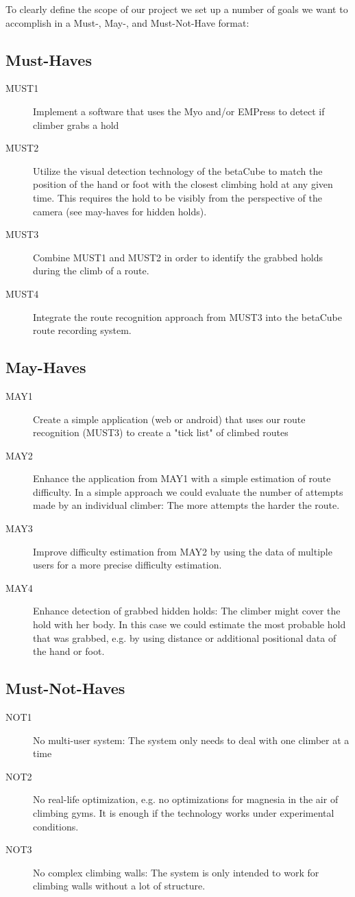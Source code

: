 To clearly define the scope of our project we set up a number of goals we want to accomplish in a Must-, May-, and Must-Not-Have format:

\subsection{Must-Haves}
\begin{description}
	\item[MUST1] Implement a software that uses the Myo and/or EMPress to detect if climber grabs a hold
	\item[MUST2] Utilize the visual detection technology of the betaCube to match the position of the hand or foot with the closest climbing hold at any given time. This requires the hold to be visibly from the perspective of the camera (see may-haves for hidden holds).
	\item[MUST3] Combine MUST1 and MUST2 in order to identify the grabbed holds during the climb of a route.
	\item[MUST4] Integrate the route recognition approach from MUST3 into the betaCube route recording system.
\end{description}
\subsection{May-Haves}
\begin{description}
	\item[MAY1] Create a simple application (web or android) that uses our route recognition (MUST3) to create a "tick list" of climbed routes
	\item[MAY2] Enhance the application from MAY1 with a simple estimation of route difficulty. In a simple approach we could evaluate the number of attempts made by an individual climber: The more attempts the harder the route.
	\item[MAY3] Improve difficulty estimation from MAY2 by using the data of multiple users for a more precise difficulty estimation.
	\item[MAY4] Enhance detection of grabbed hidden holds: The climber might cover the hold with her body. In this case we could estimate the most probable hold that was grabbed, e.g. by using distance or additional positional data of the hand or foot.
\end{description}
\subsection{Must-Not-Haves}
\begin{description}
	\item[NOT1] No multi-user system: The system only needs to deal with one climber at a time
	\item[NOT2] No real-life optimization, e.g. no optimizations for magnesia in the air of climbing gyms. It is enough if the technology works under experimental conditions.
	\item[NOT3] No complex climbing walls: The system is only intended to work for climbing walls without a lot of structure.
\end{description}